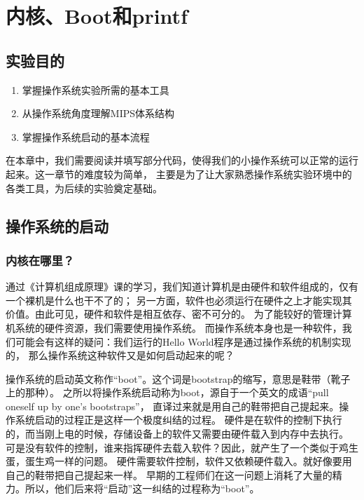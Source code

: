 \chapter{内核、Boot和printf}

\section{实验目的}
  \begin{enumerate}
    \item 掌握操作系统实验所需的基本工具
    \item 从操作系统角度理解MIPS体系结构
    \item 掌握操作系统启动的基本流程
  \end{enumerate}
在本章中，我们需要阅读并填写部分代码，使得我们的小操作系统可以正常的运行起来。这一章节的难度较为简单，
主要是为了让大家熟悉操作系统实验环境中的各类工具，为后续的实验奠定基础。
    
\section{操作系统的启动}

\subsection{内核在哪里？}
通过《计算机组成原理》课的学习，我们知道计算机是由硬件和软件组成的，仅有一个裸机是什么也干不了的；
另一方面，软件也必须运行在硬件之上才能实现其价值。由此可见，硬件和软件是相互依存、密不可分的。
为了能较好的管理计算机系统的硬件资源，我们需要使用操作系统。
而操作系统本身也是一种软件，我们可能会有这样的疑问：我们运行的Hello World程序是通过操作系统的机制实现的，
那么操作系统这种软件又是如何启动起来的呢？

\begin{note}
操作系统的启动英文称作“boot”。这个词是bootstrap的缩写，意思是鞋带（靴子上的那种）。
之所以将操作系统启动称为boot，源自于一个英文的成语“pull oneself up by one's bootstraps”，
直译过来就是用自己的鞋带把自己提起来。操作系统启动的过程正是这样一个极度纠结的过程。
硬件是在软件的控制下执行的，而当刚上电的时候，存储设备上的软件又需要由硬件载入到内存中去执行。
可是没有软件的控制，谁来指挥硬件去载入软件？因此，就产生了一个类似于鸡生蛋，蛋生鸡一样的问题。
硬件需要软件控制，软件又依赖硬件载入。就好像要用自己的鞋带把自己提起来一样。
早期的工程师们在这一问题上消耗了大量的精力。所以，他们后来将“启动”这一纠结的过程称为“boot”。
\end{note}

